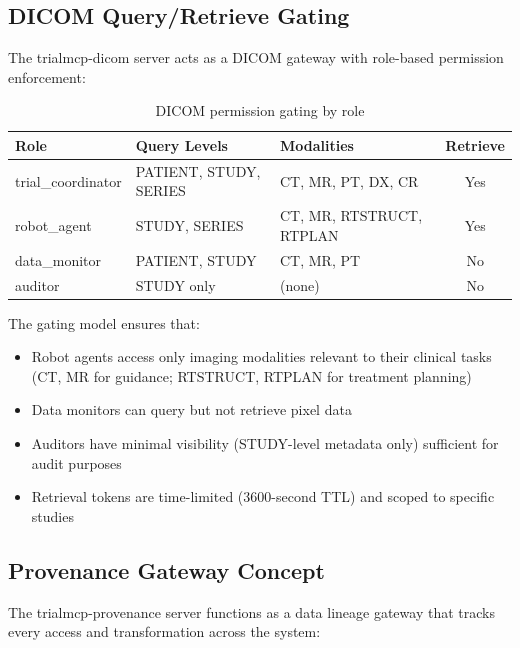 \documentclass[10pt,letterpaper]{article}
\begin{document}
\subsection{DICOM Query/Retrieve Gating}

The trialmcp-dicom server acts as a DICOM gateway with role-based permission enforcement:

\begin{table}[H]
\centering
\caption{DICOM permission gating by role}
\label{tab:dicomperm}
\small
\begin{tabularx}{\textwidth}{l l l c}
\toprule
\textbf{Role} & \textbf{Query Levels} & \textbf{Modalities} & \textbf{Retrieve} \\
\midrule
trial\_coordinator & PATIENT, STUDY, SERIES & CT, MR, PT, DX, CR & Yes \\
robot\_agent & STUDY, SERIES & CT, MR, RTSTRUCT, RTPLAN & Yes \\
data\_monitor & PATIENT, STUDY & CT, MR, PT & No \\
auditor & STUDY only & (none) & No \\
\bottomrule
\end{tabularx}
\end{table}

The gating model ensures that:
\begin{itemize}[leftmargin=2em]
    \item Robot agents access only imaging modalities relevant to their clinical tasks (CT, MR for guidance; RTSTRUCT, RTPLAN for treatment planning)
    \item Data monitors can query but not retrieve pixel data
    \item Auditors have minimal visibility (STUDY-level metadata only) sufficient for audit purposes
    \item Retrieval tokens are time-limited (3600-second TTL) and scoped to specific studies
\end{itemize}

\subsection{Provenance Gateway Concept}

The trialmcp-provenance server functions as a data lineage gateway that tracks every access and transformation across the system:
\end{document}
